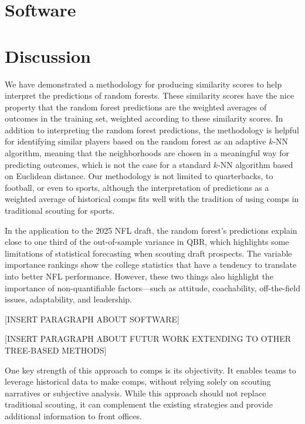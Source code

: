 \documentclass{article}
\begin{document}
\section{Software}
\label{sec:software}

\section{Discussion}
\label{sec:discussion}

We have demonstrated a methodology for producing similarity scores to help interpret the predictions of random forests. These similarity scores have the nice property that the random forest predictions are the weighted averages of outcomes in the training set, weighted according to these similarity scores. In addition to interpreting the random forest predictions, the methodology is helpful for identifying similar players based on the random forest as an adaptive $k$-NN algorithm, meaning that the neighborhoods are chosen in a meaningful way for predicting outcomes, which is not the case for a standard $k$-NN algorithm based on Euclidean distance. Our methodology is not limited to quarterbacks, to football, or even to sports, although the interpretation of predictions as a weighted average of historical comps fits well with the tradition of using comps in traditional scouting for sports.

In the application to the 2025 NFL draft, the random forest's predictions explain close to one third of the out-of-sample variance in QBR, which highlights some limitations of statistical forecasting when scouting draft prospects. The variable importance rankings show the college statistics that have a tendency to translate into better NFL performance. However, these two things also highlight the importance of non-quantifiable factors---such as attitude, coachability, off-the-field issues, adaptability, and leadership.

[INSERT PARAGRAPH ABOUT SOFTWARE]

[INSERT PARAGRAPH ABOUT FUTUR WORK EXTENDING TO OTHER TREE-BASED METHODS]

One key strength of this approach to comps is its objectivity. It enables teams to leverage historical data to make comps, without relying solely on scouting narratives or subjective analysis. While this approach should not replace traditional scouting, it can complement the existing strategies and provide additional information to front offices. 


\end{document}
